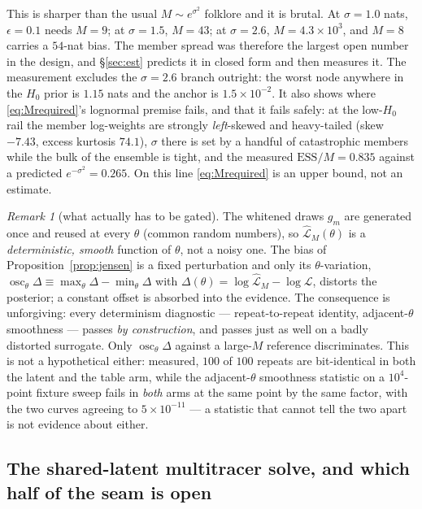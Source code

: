 \documentclass[11pt]{article}
\theoremstyle{definition}
\theoremstyle{remark}
\newtheorem{remark}{Remark}
\newcommand{\osc}{\mathop{\mathrm{osc}}}
\newcommand{\ESS}{\mathrm{ESS}}
\begin{document}
\noindent This is sharper than the usual $M\sim e^{\sigma^2}$ folklore and it is
brutal. At $\sigma=1.0$ nats, $\epsilon=0.1$ needs $M=9$; at $\sigma=1.5$, $M=43$;
at $\sigma=2.6$, $M=4.3\times10^{3}$, and $M=8$ carries a $54$-nat bias. The member
spread was therefore the largest open number in the design, and \S\ref{sec:est}
predicts it in closed form and then measures it. The measurement excludes the
$\sigma=2.6$ branch outright: the worst node anywhere in the $H_0$ prior is
$1.15$ nats and the anchor is $1.5\times10^{-2}$. It also shows where
\eqref{eq:Mrequired}'s lognormal premise fails, and that it fails safely: at the
low-$H_0$ rail the member log-weights are strongly \emph{left}-skewed and
heavy-tailed (skew $-7.43$, excess kurtosis $74.1$), $\sigma$ there is set by a
handful of catastrophic members while the bulk of the ensemble is tight, and the
measured $\ESS/M=0.835$ against a predicted $e^{-\sigma^2}=0.265$. On this line
\eqref{eq:Mrequired} is an upper bound, not an estimate.

\begin{remark}[what actually has to be gated]
\label{rem:crn}
The whitened draws $g_m$ are generated once and reused at every $\theta$ (common
random numbers), so $\widehat{\mathcal L}_M(\theta)$ is a \emph{deterministic,
smooth} function of $\theta$, not a noisy one. The bias of
Proposition~\ref{prop:jensen} is a fixed perturbation and only its
$\theta$-variation,
$\osc_\theta\Delta\equiv\max_\theta\Delta-\min_\theta\Delta$ with
$\Delta(\theta)=\log\widehat{\mathcal L}_M-\log\mathcal L$, distorts the posterior;
a constant offset is absorbed into the evidence. The consequence is unforgiving:
every determinism diagnostic --- repeat-to-repeat identity, adjacent-$\theta$
smoothness --- passes \emph{by construction}, and passes just as well on a badly
distorted surrogate. Only $\osc_\theta\Delta$ against a large-$M$ reference
discriminates. This is not a hypothetical either: measured, $100$ of $100$
repeats are bit-identical in both the latent and the table arm, while the
adjacent-$\theta$ smoothness statistic on a $10^4$-point fixture sweep fails in
\emph{both} arms at the same point by the same factor, with the two curves
agreeing to $5\times10^{-11}$ --- a statistic that cannot tell the two apart is
not evidence about either.
\end{remark}

\subsection{The shared-latent multitracer solve, and which half of the seam is open}
\label{sec:seam}
\end{document}
